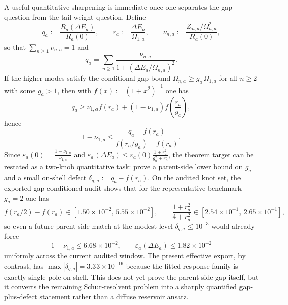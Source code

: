 \documentclass[aps,prd,onecolumn,notitlepage,nofootinbib,superscriptaddress,11pt,floatfix]{revtex4-2}
\begin{document}
A useful quantitative sharpening is immediate once one separates the gap question from the tail-weight question. Define
\[
q_a:=\frac{R_a(\Delta E_a)}{R_a(0)},\qquad
r_a:=\frac{\Delta E_a}{\Omega_{1,a}},\qquad
\nu_{n,a}:=\frac{Z_{n,a}/\Omega_{n,a}^2}{R_a(0)},
\]
so that $\sum_{n\ge1}\nu_{n,a}=1$ and
\[
q_a=\sum_{n\ge1}\frac{\nu_{n,a}}{1+(\Delta E_a/\Omega_{n,a})^2}.
\]
If the higher modes satisfy the conditional gap bound $\Omega_{n,a}\ge g_a\,\Omega_{1,a}$ for all $n\ge2$ with some $g_a>1$, then with $f(x):=(1+x^2)^{-1}$ one has
\[
q_a\ge \nu_{1,a} f(r_a) + (1-\nu_{1,a}) f\!\left(\frac{r_a}{g_a}\right),
\]
hence
\[
1-\nu_{1,a}
\le
\frac{q_a-f(r_a)}{f(r_a/g_a)-f(r_a)}.
\]
Since $\varepsilon_a(0)=\frac{1-\nu_{1,a}}{\nu_{1,a}}$ and $\varepsilon_a(\Delta E_a)\le \varepsilon_a(0)\frac{1+r_a^2}{g_a^2+r_a^2}$, the theorem target can be restated as a two-knob quantitative task: prove a parent-side lower bound on $g_a$ and a small on-shell defect $\delta_{q,a}:=q_a-f(r_a)$. On the audited knot set, the exported gap-conditioned audit shows that for the representative benchmark $g_a=2$ one has
\[
f(r_a/2)-f(r_a)\in[1.50\times10^{-2},\,5.55\times10^{-2}],
\qquad
\frac{1+r_a^2}{4+r_a^2}\in[2.54\times10^{-1},\,2.65\times10^{-1}],
\]
so even a future parent-side match at the modest level $\delta_{q,a}\le 10^{-3}$ would already force
\[
1-\nu_{1,a}\le 6.68\times10^{-2},
\qquad
\varepsilon_a(\Delta E_a)\le 1.82\times10^{-2}
\]
uniformly across the current audited window. The present effective export, by contrast, has $\max|\delta_{q,a}|=3.33\times10^{-16}$ because the fitted response family is exactly single-pole on shell. This does not yet prove the parent-side gap itself, but it converts the remaining Schur-resolvent problem into a sharply quantified gap-plus-defect statement rather than a diffuse reservoir ansatz.
\end{document}
